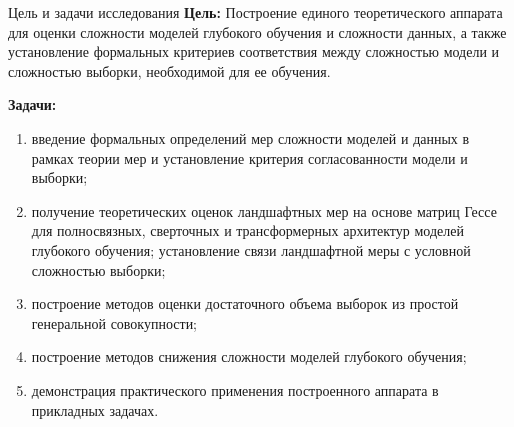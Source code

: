 \documentclass[10pt,pdf,hyperref={unicode}]{beamer}
\begin{document}
\begin{frame}{Цель и задачи исследования}
\justifying
\textbf{Цель:} Построение единого теоретического аппарата для оценки сложности моделей глубокого обучения и сложности данных, а также установление формальных критериев соответствия между сложностью модели и сложностью выборки, необходимой для ее обучения.

\vspace{0.3cm}
\textbf{Задачи:}
\begin{enumerate}
    \justifying
    \item[--] введение формальных определений мер сложности моделей и данных в рамках теории мер и установление критерия согласованности модели и выборки;
    \item[--] получение теоретических оценок ландшафтных мер на основе матриц Гессе для полносвязных, сверточных и трансформерных архитектур моделей глубокого обучения; установление связи ландшафтной меры с условной сложностью выборки;
    \item[--] построение методов оценки достаточного объема выборок из простой генеральной совокупности;
    \item[--] построение методов снижения сложности моделей глубокого обучения;
    \item[--] демонстрация практического применения построенного аппарата в прикладных задачах.
\end{enumerate}
\end{frame}
\end{document}
